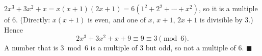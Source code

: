 $2x^3+3x^2+x=x(x+1)(2x+1)=6(1^2+2^2+\cdots+x^2)$, so it is a multiple of $6$. (Directly: $x(x+1)$ is even, and one of $x$, $x+1$, $2x+1$ is divisible by $3$.) Hence
\[2x^3+3x^2+x+9\equiv9\equiv3\pmod6.\]
A number that is $3\bmod6$ is a multiple of $3$ but odd, so not a multiple of $6$. $\blacksquare$
